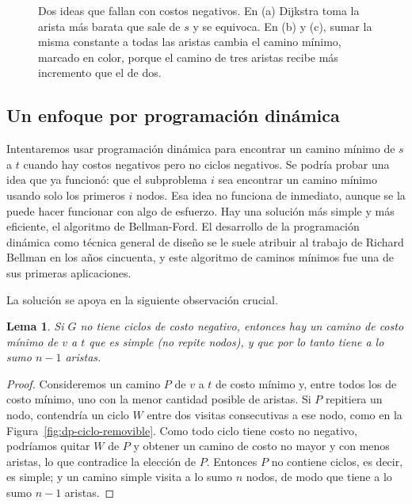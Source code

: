 \documentclass[12pt, spanish, oneside, openany]{book}
\theoremstyle{uprightplain}
\newtheorem{lema}[teorema]{Lema}
\theoremstyle{definition}
\theoremstyle{remark}
\theoremstyle{definition}
\begin{document}
\begin{figure}[H]
\caption{Dos ideas que fallan con costos negativos. En (a) Dijkstra toma la
arista más barata que sale de $s$ y se equivoca. En (b) y (c), sumar la misma
constante a todas las aristas cambia el camino mínimo, marcado en color, porque
el camino de tres aristas recibe más incremento que el de dos.}
\label{fig:dp-intentos-fallidos}
\end{figure}

\subsection{Un enfoque por programación dinámica}

Intentaremos usar programación dinámica para encontrar un camino mínimo de $s$ a $t$ cuando hay costos negativos pero no ciclos negativos. Se podría probar una idea que ya funcionó: que el subproblema $i$ sea encontrar un camino mínimo usando solo los primeros $i$ nodos. Esa idea no funciona de inmediato, aunque se la puede hacer funcionar con algo de esfuerzo. Hay una solución más simple y más eficiente, el algoritmo de Bellman-Ford. El desarrollo de la programación dinámica como técnica general de diseño se le suele atribuir al trabajo de Richard Bellman en los años cincuenta, y este algoritmo de caminos mínimos fue una de sus primeras aplicaciones.

La solución se apoya en la siguiente observación crucial.

\begin{lema}
\label{lema:dp-camino-simple}
Si $G$ no tiene ciclos de costo negativo, entonces hay un camino de costo mínimo de $v$ a $t$ que es simple (no repite nodos), y que por lo tanto tiene a lo sumo $n-1$ aristas.
\end{lema}
\begin{proof}
Consideremos un camino $P$ de $v$ a $t$ de costo mínimo y, entre todos los de costo mínimo, uno con la menor cantidad posible de aristas. Si $P$ repitiera un nodo, contendría un ciclo $W$ entre dos visitas consecutivas a ese nodo, como en la Figura~\ref{fig:dp-ciclo-removible}. Como todo ciclo tiene costo no negativo, podríamos quitar $W$ de $P$ y obtener un camino de costo no mayor y con menos aristas, lo que contradice la elección de $P$. Entonces $P$ no contiene ciclos, es decir, es simple; y un camino simple visita a lo sumo $n$ nodos, de modo que tiene a lo sumo $n-1$ aristas.
\end{proof}
\end{document}

